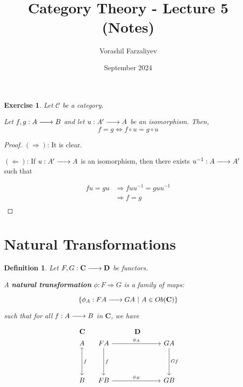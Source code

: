 \documentclass{article}
\title{Category Theory - Lecture 5 (Notes)}
\author{Vorashil Farzaliyev}
\date{September 2024}
\newtheorem{definition}{Definition}[section]
\newtheorem{exercise}{Exercise}[section]
\renewcommand{\to}{\xrightarrow{\hspace{0.5cm}}}  %
\begin{document}
    \maketitle

    \begin{exercise}
        Let $\mathcal{C}$ be a category.

        Let \(f, g: A \to B\) and let \(u: A' \to A\) be an isomorphism.
        Then,
        \[
            f = g \Leftrightarrow f \circ u = g \circ u
        \]
    \end{exercise}

    \begin{proof}
        \((\Rightarrow)\): It is clear.


        \((\Leftarrow)\): If \(u: A' \to A\) is an isomorphism, then there exists \(u^{-1}: A \to A'\) such that

        \[
            \begin{align}
                fu = gu &\Rightarrow fuu^{-1} = guu^{-1} \\
                &\Rightarrow f = g \\
            \end{align}
        \]
    \end{proof}


    \section{Natural Transformations}

    \begin{definition}
        Let \(F, G: \mathbf{C} \to \mathbf{D}\) be functors.

        A \textbf{natural transformation} \(\phi: F \Rightarrow G\) is a family of maps:

        \[
            \{\phi_A: FA \to GA \ | \ A \in Ob(\mathbf{C})\}
        \]

        such that for all \(f: A \to B\) in \(\mathbf{C}\), we have

        \[
            \begin{array}{c c} %
                \mathbf{C} & \mathbf{D} \\
                \begin{tikzcd}[column sep=4em, row sep=4em]
                    A \arrow[d, mapsto, "f"] \\
                    B
                \end{tikzcd}
                &
                \begin{tikzcd}[column sep=7em, row sep=4em]
                    FA \arrow[r, "\phi_A"] \arrow[d, "f"]
                    & GA \arrow[d, "Gf"] \\
                    FB\arrow[r, "\phi_B"]
                    & GB
                \end{tikzcd}
            \end{array}
        \]
    \end{definition}
\end{document}
